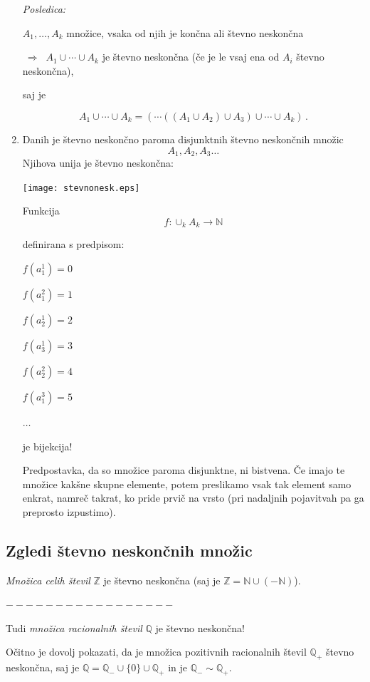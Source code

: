 \documentclass[11pt,paper=b5,footinclude,headinclude]{scrbook} %
\def\sledi {{~\Rightarrow~}}
\begin{document}
\begin{enumerate}[(1.)]
\medskip
{\em Posledica:}

$A_1,\ldots, A_k$ množice, vsaka od njih je končna ali števno neskončna

$\sledi$ $A_1\cup\cdots\cup A_k$ je števno neskončna (če je le vsaj ena od $A_i$ števno neskončna),

saj je

$$A_1\cup\cdots\cup A_k = (\cdots ((A_1\cup A_2)\cup A_3)\cup\cdots \cup A_k)\,.$$
%

\item Danih je števno neskončno paroma disjunktnih števno neskončnih množic
$$A_1, A_2,A_3\ldots$$
Njihova unija je števno neskončna:
\begin{center}
\texttt{[image: stevnonesk.eps]}
\end{center}

Funkcija
$$f:\cup_{k}A_k\to \mathbb{N}$$

definirana s predpisom:

$f(a_1^1) = 0$

$f(a_1^2) = 1$

$f(a_2^1) = 2$

$f(a_3^1) = 3$

$f(a_2^2) = 4$

$f(a_1^3) = 5$

$\ldots$

je bijekcija!

Predpostavka, da so množice paroma disjunktne, ni bistvena. Če imajo te množice kakšne skupne elemente, potem preslikamo vsak tak element samo enkrat, namreč takrat, ko pride prvič na vrsto (pri nadaljnih pojavitvah pa ga preprosto izpustimo).
\end{enumerate}

\subsection{Zgledi števno neskončnih množic}

\bigskip
{\em Množica celih števil} $\mathbb{Z}$ je števno neskončna (saj je $\mathbb{Z} = \mathbb{N}\cup (-\mathbb{N})$).

\bigskip
$-----------------$
\bigskip

Tudi {\em množica racionalnih števil} $\mathbb{Q}$ je števno neskončna!

Očitno je dovolj pokazati, da je množica pozitivnih racionalnih števil $\mathbb{Q}_+$
 števno neskončna, saj je $\mathbb{Q} = \mathbb{Q}_-\cup \{0\}\cup \mathbb{Q}_+$ in je
$\mathbb{Q}_-\sim \mathbb{Q}_+$.
\end{document}
